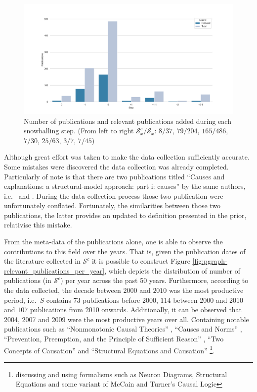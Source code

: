 \documentclass[11pt,a4paper]{book}
\theoremstyle{definition}
\theoremstyle{definition}
\theoremstyle{definition}
\theoremstyle{remark}
\newcommand{\pset}{S}
\newcommand{\xset}{\mathcal{S}}
\begin{document}
\begin{figure}[h!]
\includegraphics[width=\textwidth]{relevant_publications_per_step.png}
\caption{Number of publications and relevant publications added during each snowballing step.
(From left to right $\xset_x^c/\xset_x$: $8/37$, $79/204$, $165/486$, $7/30$, $25/63$, $3/7$, $7/45$)}
\label{fig:pgraph-relevant_publications_per_step}
\end{figure}




Although great effort was taken to make the data collection sufficiently accurate. Some mistakes were discovered the data collection was already completed.
Particularly of note is that there are two publications titled ``Causes and explanations: a structural-model approach: part i: causes'' by the same authors, i.e.\ \parencite{halpern2001causes} and \parencite{halpern2005causes}.
During the data collection process those two publication were unfortunately conflated. Fortunately, the similarities between those two publications, the latter provides an updated to definition presented in the prior, relativise this mistake.


From the meta-data of the publications alone, one is able to observe the contributions to this field over the years. That is, given the publication dates of the literature collected in $\xset^c$ it is possible to construct Figure \ref{fig:pgraph-relevant_publications_per_year}, which depicts the distribution of number of publications (in $\xset^c$) per year across the past 50 years.
Furthermore, according to the data collected, the decade between $2000$ and $2010$ was the most productive period, i.e.\ $\pset$ contains $73$ publications before 2000, $114$ between 2000 and 2010 and $107$ publications from 2010 onwards. Additionally, it can be observed that 2004, 2007 and 2009 were the most productive years over all. Containing notable publications such as 
``Nonmonotonic Causal Theories'' \parencite{giunchiglia2004nonmonotonic}, ``Causes and Norms'' \parencite{hitchcock2009cause}, ``Prevention, Preemption, and the Principle of Sufficient Reason'' \parencite{hitchcock2007prevention}, ``Two Concepts of Causation'' \parencite{hall2004two} and ``Structural Equations and Causation'' \parencite{hall2007structural}
\footnote{discussing and using formalisms such as Neuron Diagrams, Structural Equations and some variant of McCain and Turner's Causal Logic}.
\end{document}
